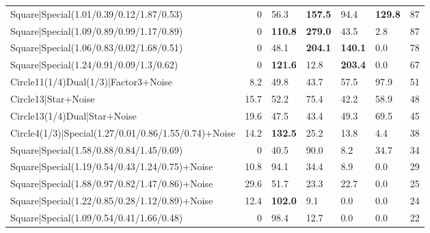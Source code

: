 \begin{tabular}{lrllllr}
 Square|Special(1.01/0.39/0.12/1.87/0.53)                      &             0   & 56.3           & \textbf{157.5}  & 94.4            & \textbf{129.8}  &           87 \\
 Square|Special(1.09/0.89/0.99/1.17/0.89)                      &             0   & \textbf{110.8} & \textbf{279.0}  & 43.5            & 2.8             &           87 \\
 Square|Special(1.06/0.83/0.02/1.68/0.51)                      &             0   & 48.1           & \textbf{204.1}  & \textbf{140.1}  & 0.0             &           78 \\
 Square|Special(1.24/0.91/0.09/1.3/0.62)                       &             0   & \textbf{121.6} & 12.8            & \textbf{203.4}  & 0.0             &           67 \\
 Circle11(1/4)Dual(1/3)|Factor3+Noise                          &             8.2 & 49.8           & 43.7            & 57.5            & 97.9            &           51 \\
 Circle13|Star+Noise                                           &            15.7 & 52.2           & 75.4            & 42.2            & 58.9            &           48 \\
 Circle13(1/4)Dual|Star+Noise                                  &            19.6 & 47.5           & 43.4            & 49.3            & 69.5            &           45 \\
 Circle4(1/3)|Special(1.27/0.01/0.86/1.55/0.74)+Noise          &            14.2 & \textbf{132.5} & 25.2            & 13.8            & 4.4             &           38 \\
 Square|Special(1.58/0.88/0.84/1.45/0.69)                      &             0   & 40.5           & 90.0            & 8.2             & 34.7            &           34 \\
 Square|Special(1.19/0.54/0.43/1.24/0.75)+Noise                &            10.8 & 94.1           & 34.4            & 8.9             & 0.0             &           29 \\
 Square|Special(1.88/0.97/0.82/1.47/0.86)+Noise                &            29.6 & 51.7           & 23.3            & 22.7            & 0.0             &           25 \\
 Square|Special(1.22/0.85/0.28/1.12/0.89)+Noise                &            12.4 & \textbf{102.0} & 9.1             & 0.0             & 0.0             &           24 \\
 Square|Special(1.09/0.54/0.41/1.66/0.48)                      &             0   & 98.4           & 12.7            & 0.0             & 0.0             &           22 \\

\end{tabular}
